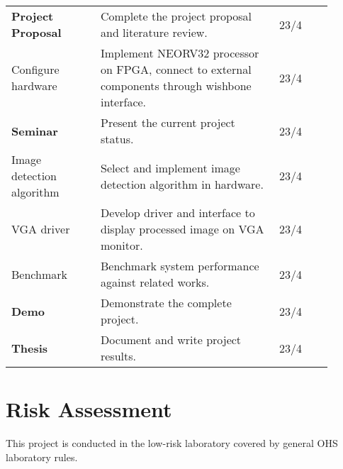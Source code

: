 \begin{center}
\begin{longtable}{p{0.25\linewidth}p{0.5\linewidth}p{0.15\linewidth}}
        \textbf{Project Proposal}	& Complete the project proposal and literature review.                                              & 23/4 \\
        Configure hardware			& Implement NEORV32 processor on FPGA, connect to external components through wishbone interface.   & 23/4 \\
        \textbf{Seminar}            & Present the current project status.                                                               & 23/4 \\
        Image detection algorithm   & Select and implement image detection algorithm in hardware.                                       & 23/4 \\
        VGA driver                  & Develop driver and interface to display processed image on VGA monitor.                           & 23/4 \\
        Benchmark                   & Benchmark system performance against related works.                                               & 23/4 \\
        \textbf{Demo}               & Demonstrate the complete project.                                                                 & 23/4 \\
        \textbf{Thesis}             & Document and write project results.                                                               & 23/4 \\
    \end{longtable}
\end{center}


\nopagebreak


\section{Risk Assessment}
This project is conducted in the low-risk laboratory covered by general OHS laboratory rules.